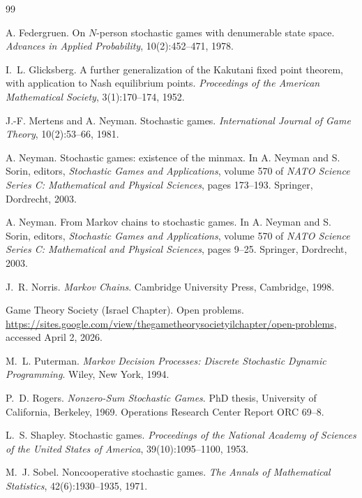\documentclass[11pt]{article}
\theoremstyle{definition}
\newcommand{\1}{\mathbf{1}}
\begin{document}
\begin{thebibliography}{99}

A. Federgruen.
\newblock On $N$-person stochastic games with denumerable state space.
\newblock \emph{Advances in Applied Probability}, 10(2):452--471, 1978.

I.~L. Glicksberg.
\newblock A further generalization of the Kakutani fixed point theorem, with application to Nash equilibrium points.
\newblock \emph{Proceedings of the American Mathematical Society}, 3(1):170--174, 1952.

J.-F. Mertens and A. Neyman.
\newblock Stochastic games.
\newblock \emph{International Journal of Game Theory}, 10(2):53--66, 1981.

A. Neyman.
\newblock Stochastic games: existence of the minmax.
\newblock In A. Neyman and S. Sorin, editors, \emph{Stochastic Games and Applications}, volume 570 of \emph{NATO Science Series C: Mathematical and Physical Sciences}, pages 173--193. Springer, Dordrecht, 2003.

A. Neyman.
\newblock From Markov chains to stochastic games.
\newblock In A. Neyman and S. Sorin, editors, \emph{Stochastic Games and Applications}, volume 570 of \emph{NATO Science Series C: Mathematical and Physical Sciences}, pages 9--25. Springer, Dordrecht, 2003.

J.~R. Norris.
\newblock \emph{Markov Chains}.
\newblock Cambridge University Press, Cambridge, 1998.

Game Theory Society (Israel Chapter).
\newblock Open problems.
\newblock \url{https://sites.google.com/view/thegametheorysocietyilchapter/open-problems}, accessed April 2, 2026.

M.~L. Puterman.
\newblock \emph{Markov Decision Processes: Discrete Stochastic Dynamic Programming}.
\newblock Wiley, New York, 1994.

P.~D. Rogers.
\newblock \emph{Nonzero-Sum Stochastic Games}.
\newblock PhD thesis, University of California, Berkeley, 1969.
\newblock Operations Research Center Report ORC 69--8.

L.~S. Shapley.
\newblock Stochastic games.
\newblock \emph{Proceedings of the National Academy of Sciences of the United States of America}, 39(10):1095--1100, 1953.

M.~J. Sobel.
\newblock Noncooperative stochastic games.
\newblock \emph{The Annals of Mathematical Statistics}, 42(6):1930--1935, 1971.


\end{thebibliography}
\end{document}
